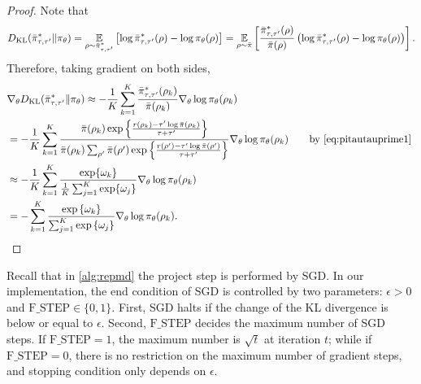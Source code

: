 \begin{proof}
	Note that
	\begin{equation*}
	\label{eq:importance_sampling_kl}
	D_{\mathrm{KL}}(\bar{\pi}_{\tau,\tau^{\prime}}^* \| \pi_\theta) = \operatorname*{\mathbb{E}}_{\rho \sim \bar{\pi}_{\tau,\tau^{\prime}}^* } \left[ \log \bar{\pi}_{\tau,\tau^{\prime}}^*(\rho) - \log \pi_\theta(\rho) \right] = \operatorname*{\mathbb{E}}_{\rho\sim \bar{\pi}} \left[  \frac{\bar{\pi}_{\tau,\tau^{\prime}}^*(\rho)}{\bar{\pi}(\rho)} \left(\log \bar{\pi}_{\tau,\tau^{\prime}}^*(\rho) - \log \pi_\theta(\rho) \right) \right].
	\end{equation*}	
	Therefore, taking gradient on both sides,
	\begin{equation}
	\begin{split}
	&\nabla_{\theta} D_{\mathrm{KL}}(\bar{\pi}_{\tau,\tau^{\prime}}^* \| \pi_\theta) \approx -\frac{1}{K}\sum_{k=1}^K \frac{\bar{\pi}_{\tau,\tau^{\prime}}^* (\rho_k)}{\bar{\pi}(\rho_k)} \nabla_{\theta} \log \pi_\theta(\rho_k)\\ 
	&= -\frac{1}{K}\sum_{k=1}^K \frac{ \bar{\pi}(\rho_k) \exp\left\{ \frac{r(\rho_k)-\tau^{\prime} \log \bar{\pi}(\rho_k) }{ \tau+\tau^{\prime}} \right\} }{\bar{\pi}(\rho_k)  \sum_{\rho^{\prime}}{\bar{\pi}(\rho^{\prime}) \exp\left\{ \frac{r(\rho^{\prime})-\tau^{\prime} \log \bar{\pi}(\rho^{\prime})}{ \tau+\tau^{\prime}} \right\} }  } \nabla_{\theta} \log \pi_\theta(\rho_k) \qquad \text{by \ref{eq:pitautauprime1} }  \\
	&\approx -\frac{1}{K}\sum_{k=1}^K \frac{\exp \{\omega_k\}} {\frac{1}{K} \sum_{j=1}^K \exp \{\omega_j\}} \nabla_{\theta} \log \pi_\theta(\rho_k) \\
	&=  -\sum\limits_{k=1}^K{ \frac{ \exp\left\{ \omega_k \right\} }{ \sum_{j=1}^K{ \exp\left\{ \omega_j \right\}}} \nabla_{\theta} \log{\pi_\theta(\rho_k)} } \qedhere.
	\end{split}
	\end{equation}
\end{proof}

Recall that in \cref{alg:repmd} the project step is performed by SGD. In our implementation, the end condition of SGD is controlled by two parameters: $\epsilon > 0$ and $\text{F\_STEP}\in \{0,1 \}$. First, SGD halts if the change of the KL divergence is below or equal to $\epsilon$. Second, $\text{F\_STEP}$ decides the maximum number of SGD steps. If $\text{F\_STEP}=1$, the maximum number is $\sqrt{t}$ at iteration $t$; while if $\text{F\_STEP}=0$, there is no restriction on the maximum number of gradient steps, and stopping condition only depends on $\epsilon$.

